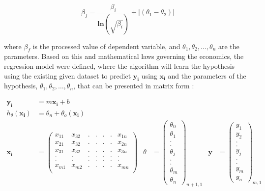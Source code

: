 \documentclass{article}
\begin{document}
    \begin{equation}
        \beta_f = \frac{\beta_i}{\mathbf{ln}(\sqrt{\beta_i})} + |(\theta_1 - \theta_2)|
    \end{equation}

where $\beta_f$ is the processed value of dependent variable, and $\theta_1, \theta_2, \dots, \theta_n$ are the parameters. Based on this and mathematical laws governing the economics, the regression model were defined, where the algorithm will learn the hypothesis using the existing given dataset to predict $\mathbf{y_i}$ using $\mathbf{x_i}$ and the parameters of the hypothesis, $\theta_1, \theta_2, \dots, \theta_n$, that can be presented in matrix form :

    \begin{align}
        \mathbf{y_i} &= m\mathbf{x_i} + b \\
    	h_\theta (\mathbf{x_i}) &= \theta_n + \theta_o (\mathbf{x_i}) \nonumber \\
    	\mathbf{x_i} &= \begin{pmatrix}
    		x_{11} & x_{32} & . & . & . & . & x_{1n} \\
    		x_{21} & x_{32} & . & . & . & . & x_{2n} \\
    		x_{31} & x_{32} & . & . & . & . & x_{3n} \\
    		. & . & . & . & . & . & . \\
    		. & . & . & . & . & . & . \\
    		x_{m1} & x_{m2} & . & . & . & . & x_{mn} \\
    	\end{pmatrix} & \theta &= \begin{pmatrix}
    		\theta_0 \\
    		\theta_1 \\
    		. \\
    		. \\
    	    \theta_j \\
    	    . \\ 
    	    . \\
    		\theta_{m} \\ 
    		\theta_{n}
    	\end{pmatrix}_{n+1,1} & \mathbf{y} &= \begin{pmatrix}
    		y_1 \\
    		y_2 \\
    		. \\
    		. \\
    	    y_j \\
    	    . \\ 
    	    . \\
    		y_{m}  \\ 
    		y_{n}
    	\end{pmatrix}_{m,1}  
    \end{align}
    
\end{document}
